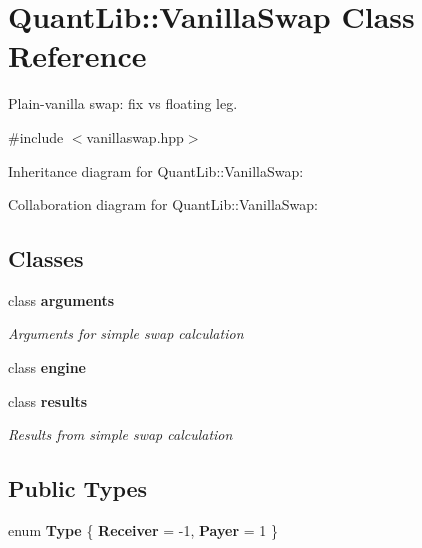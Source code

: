 \section{Quant\+Lib\+:\+:Vanilla\+Swap Class Reference}
\label{class_quant_lib_1_1_vanilla_swap}


Plain-\/vanilla swap\+: fix vs floating leg.  




{\ttfamily \#include $<$vanillaswap.\+hpp$>$}



Inheritance diagram for Quant\+Lib\+:\+:Vanilla\+Swap\+:


Collaboration diagram for Quant\+Lib\+:\+:Vanilla\+Swap\+:
\subsection*{Classes}
\begin{DoxyCompactItemize}
\item 
class {\bf arguments}
\begin{DoxyCompactList}\small\item\em Arguments for simple swap calculation \end{DoxyCompactList}\item 
class {\bf engine}
\item 
class {\bf results}
\begin{DoxyCompactList}\small\item\em Results from simple swap calculation \end{DoxyCompactList}\end{DoxyCompactItemize}
\subsection*{Public Types}
\begin{DoxyCompactItemize}
\item 
enum {\bfseries Type} \{ {\bfseries Receiver} = -\/1, 
{\bfseries Payer} = 1
 \}\label{class_quant_lib_1_1_vanilla_swap_a6a061a5c3c8f87e4ce3a786d313f8d97}

\end{DoxyCompactItemize}

